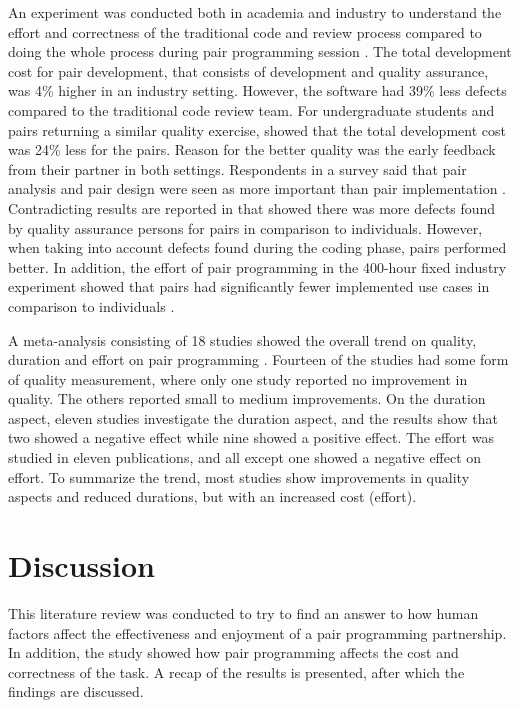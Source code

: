 \documentclass[conference]{IEEEtran}
\begin{document}
An experiment was conducted both in academia and industry to understand the effort and correctness of the traditional code and review process compared to doing the whole process during pair programming session \cite{10.1145/1159733.1159749}. The total development cost for pair development, that consists of development and quality assurance, was 4\% higher in an industry setting. However, the software had 39\% less defects compared to the traditional code review team. For undergraduate students and pairs returning a similar quality exercise, showed that the total development cost was 24\% less for the pairs. Reason for the better quality was the early feedback from their partner in both settings. Respondents in a survey said that pair analysis and pair design were seen as more important than pair implementation \cite{Williams2000Strengthening}. Contradicting results are reported in \cite{1541842} that showed there was more defects found by quality assurance persons for pairs in comparison to individuals. However, when taking into account defects found during the coding phase, pairs performed better. In addition, the effort of pair programming in the 400-hour fixed industry experiment showed that pairs had significantly fewer implemented use cases in comparison to individuals \cite{1541842}.

A meta-analysis consisting of 18 studies showed the overall trend on quality, duration and effort on pair programming \cite{Hannay2009effectiveness}. Fourteen of the studies had some form of quality measurement, where only one study reported no improvement in quality. The others reported small to medium improvements. On the duration aspect, eleven studies investigate the duration aspect, and the results show that two showed a negative effect while nine showed a positive effect. The effort was studied in eleven publications, and all except one showed a negative effect on effort. To summarize the trend, most studies show improvements in quality aspects and reduced durations, but with an increased cost (effort). 


\section{Discussion}

This literature review was conducted to try to find an answer to how human factors affect the effectiveness and enjoyment of a pair programming partnership. In addition, the study showed how pair programming affects the cost and correctness of the task. A recap of the results is presented, after which the findings are discussed. 
\end{document}
